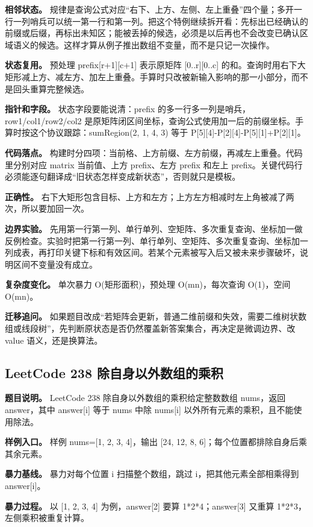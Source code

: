 \textbf{相邻状态。} 规律是查询公式对应“右下、上方、左侧、左上重叠”四个量；多开一行一列哨兵可以统一第一行和第一列。把这个特例继续拆开看：先标出已经确认的前缀或后缀，再标出未知区；能被丢掉的候选，必须是以后再也不会改变已确认区域语义的候选。这样才算从例子推出数组不变量，而不是只记一次操作。

\textbf{状态复用。} 预处理 prefix[r+1][c+1] 表示原矩阵 [0..r][0..c] 的和。查询时用右下大矩形减上方、减左方、加左上重叠。手算时只改被新输入影响的那一小部分，而不是回头重算完整候选。

\textbf{指针和字段。} 状态字段要能说清：prefix 的多一行多一列是哨兵，row1/col1/row2/col2 是原矩阵闭区间坐标，查询公式使用加一后的前缀坐标。手算时按这个协议跟踪：sumRegion(2, 1, 4, 3) 等于 P[5][4]-P[2][4]-P[5][1]+P[2][1]。

\textbf{代码落点。} 构建时分四项：当前格、上方前缀、左方前缀，再减左上重叠。代码里分别对应 matrix 当前值、上方 prefix、左方 prefix 和左上 prefix。关键代码行必须能逐句翻译成“旧状态怎样变成新状态”，否则就只是模板。

\textbf{正确性。} 右下大矩形包含目标、上方和左方；上方左方相减时左上角被减了两次，所以要加回一次。

\textbf{边界实验。} 先用第一行第一列、单行单列、空矩阵、多次重复查询、坐标加一做反例检查。实验时把第一行第一列、单行单列、空矩阵、多次重复查询、坐标加一列成表，再打印关键下标和有效区间。若某个元素被写入后又被未来步骤破坏，说明区间不变量没有成立。

\textbf{复杂度变化。} 单次暴力 O(矩形面积)，预处理 O(mn)，每次查询 O(1)，空间 O(mn)。

\textbf{迁移追问。} 如果题目改成“若矩阵会更新，普通二维前缀和失效，需要二维树状数组或线段树”，先判断原状态是否仍然覆盖新答案集合，再决定是微调边界、改 value 语义，还是换算法。

\subsection{LeetCode 238 除自身以外数组的乘积}

\textbf{题目说明。} LeetCode 238 除自身以外数组的乘积给定整数数组 nums，返回 answer，其中 answer[i] 等于 nums 中除 nums[i] 以外所有元素的乘积，且不能使用除法。

\textbf{样例入口。} 样例 nums=[1, 2, 3, 4]，输出 [24, 12, 8, 6]；每个位置都排除自身后乘其余元素。

\textbf{暴力基线。} 暴力对每个位置 i 扫描整个数组，跳过 i，把其他元素全部相乘得到 answer[i]。

\textbf{暴力过程。} 以 [1, 2, 3, 4] 为例，answer[2] 要算 1*2*4；answer[3] 又重算 1*2*3，左侧乘积被重复计算。

